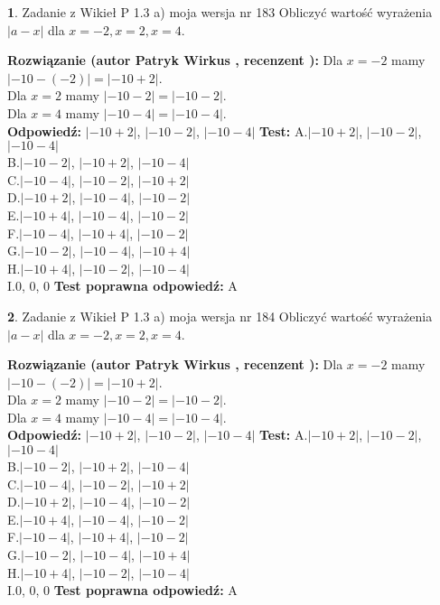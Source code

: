 \documentclass[12pt, a4paper]{article}
\theoremstyle{definition} %
\newtheorem{zad}{}
\newcommand{\zadStart}[1]{\begin{zad}#1\newline}
\newcommand{\zadStop}{\end{zad}}
\newcommand{\rozwStart}[2]{\noindent \textbf{Rozwiązanie (autor #1 , recenzent #2): }\newline}
\newcommand{\rozwStop}{\newline}
\newcommand{\odpStart}{\noindent \textbf{Odpowiedź:}\newline}
\newcommand{\odpStop}{\newline}
\newcommand{\testStart}{\noindent \textbf{Test:}\newline}
\newcommand{\testStop}{\newline}
\newcommand{\kluczStart}{\noindent \textbf{Test poprawna odpowiedź:}\newline}
\newcommand{\kluczStop}{\newline}
\begin{document}
\zadStart{Zadanie z Wikieł P 1.3 a) moja wersja nr 183}
Obliczyć wartość wyrażenia $|a - x|$ dla $x=-2,x=2,x=4$.
\zadStop
\rozwStart{Patryk Wirkus}{}
Dla $x = -2$ mamy $|-10 - (-2)| = |-10 + 2|$.\\
Dla $x = 2$ mamy $|-10 - 2| = |-10 - 2|$.\\
Dla $x = 4$ mamy $|-10 - 4| = |-10 - 4|$.\\
\rozwStop
\odpStart
$|-10 + 2|$, $|-10 - 2|$, $|-10 - 4|$
\odpStop
\testStart
A.$|-10 + 2|$, $|-10 - 2|$, $|-10 - 4|$\\
B.$|-10 - 2|$, $|-10 + 2|$, $|-10 - 4|$\\
C.$|-10 - 4|$, $|-10 - 2|$, $|-10 + 2|$\\
D.$|-10 + 2|$, $|-10 - 4|$, $|-10 - 2|$\\
E.$|-10 + 4|$, $|-10 - 4|$, $|-10 - 2|$\\
F.$|-10 - 4|$, $|-10 + 4|$, $|-10 - 2|$\\
G.$|-10 - 2|$, $|-10 - 4|$, $|-10 + 4|$\\
H.$|-10 + 4|$, $|-10 - 2|$, $|-10 - 4|$\\
I.$0$, $0$, $0$
\testStop
\kluczStart
A
\kluczStop



\zadStart{Zadanie z Wikieł P 1.3 a) moja wersja nr 184}
Obliczyć wartość wyrażenia $|a - x|$ dla $x=-2,x=2,x=4$.
\zadStop
\rozwStart{Patryk Wirkus}{}
Dla $x = -2$ mamy $|-10 - (-2)| = |-10 + 2|$.\\
Dla $x = 2$ mamy $|-10 - 2| = |-10 - 2|$.\\
Dla $x = 4$ mamy $|-10 - 4| = |-10 - 4|$.\\
\rozwStop
\odpStart
$|-10 + 2|$, $|-10 - 2|$, $|-10 - 4|$
\odpStop
\testStart
A.$|-10 + 2|$, $|-10 - 2|$, $|-10 - 4|$\\
B.$|-10 - 2|$, $|-10 + 2|$, $|-10 - 4|$\\
C.$|-10 - 4|$, $|-10 - 2|$, $|-10 + 2|$\\
D.$|-10 + 2|$, $|-10 - 4|$, $|-10 - 2|$\\
E.$|-10 + 4|$, $|-10 - 4|$, $|-10 - 2|$\\
F.$|-10 - 4|$, $|-10 + 4|$, $|-10 - 2|$\\
G.$|-10 - 2|$, $|-10 - 4|$, $|-10 + 4|$\\
H.$|-10 + 4|$, $|-10 - 2|$, $|-10 - 4|$\\
I.$0$, $0$, $0$
\testStop
\kluczStart
A
\kluczStop
\end{document}

